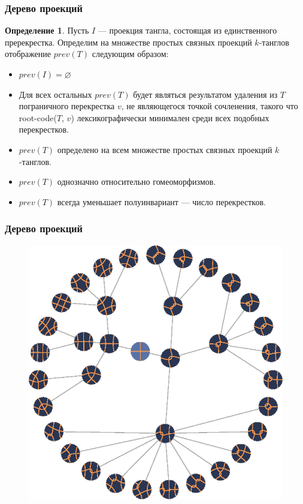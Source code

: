 \documentclass[dvips, intlimits, 9pt, unicode, notheorems, color=usenames,dvipsnames]{beamer}
\theoremstyle{plain}
\theoremstyle{definition}
\newtheorem{definition}{Определение}
\begin{document}
	\begin{frame}
		\frametitle{Дерево проекций}

		\begin{definition}
			Пусть $I$ --- проекция тангла, состоящая из единственного пререкрестка. Определим на множестве простых связных
			проекций $k$-танглов отображение $prev(T)$ следующим образом:
			\begin{itemize}
				\item
				$prev(I) = \varnothing$

				\item
				Для всех остальных $prev(T)$ будет являться результатом удаления из $T$ пограничного перекрестка $v$, не
				являющегося точкой сочленения, такого что root-code($T$, $v$) лексикографически минимален среди всех подобных
				перекрестков.
			\end{itemize}
		\end{definition}

		\begin{itemize}
			\item $prev(T)$ определено на всем множестве простых связных проекций $k$-танглов.
			\item $prev(T)$ однозначно относительно гомеоморфизмов.
			\item $prev(T)$ всегда уменьшает полуинвариант --- число перекрестков.
		\end{itemize}
	\end{frame}

	\begin{frame}
		\frametitle{Дерево проекций}

		\begin{figure}[ht]
			\centering
			\includegraphics[scale = 0.9]{c/genealogical-tree.eps}
		\end{figure}
	\end{frame}
\end{document}
